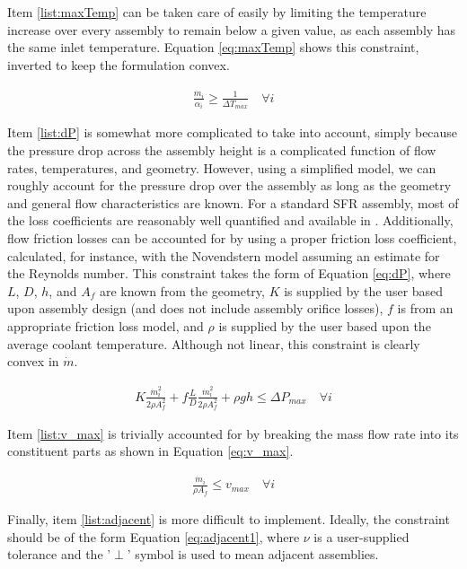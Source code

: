 \documentclass[11pt, oneside]{article}   	%
\begin{document}
Item \ref{list:maxTemp} can be taken care of easily by limiting the temperature increase over every assembly to remain below a given value, as each assembly has the same inlet temperature.
Equation \ref{eq:maxTemp} shows this constraint, inverted to keep the formulation convex.

\begin{align}
\frac{\dot{m}_i}{\alpha_i} \geq \frac{1}{\Delta T_{max}} \quad \forall i \label{eq:maxTemp}
\end{align}

Item \ref{list:dP} is somewhat more complicated to take into account, simply because the pressure drop across the assembly height is a complicated function of flow rates, temperatures, and geometry.
However, using a simplified model, we can roughly account for the pressure drop over the assembly as long as the geometry and general flow characteristics are known.
For a standard SFR assembly, most of the loss coefficients are reasonably well quantified and available in \cite{Waltar}.
Additionally, flow friction losses can be accounted for by using a proper friction loss coefficient, calculated, for instance, with the Novendstern model assuming an estimate for the Reynolds number.
This constraint takes the form of Equation \ref{eq:dP}, where $L$, $D$, $h$, and $A_f$ are known from the geometry, $K$ is supplied by the user based upon assembly design (and does not include assembly orifice losses), $f$ is from an appropriate friction loss model, and $\rho$ is supplied by the user based upon the average coolant temperature.
Although not linear, this constraint is clearly convex in $\dot{m}$.

\begin{align}
K \frac{\dot{m}_i^2}{2 \rho A_f^2} + f \frac{L}{D} \frac{\dot{m}_i^2}{2 \rho A_f^2} + \rho g h \leq \Delta P_{max}  \quad \forall i \label{eq:dP}
\end{align}

Item \ref{list:v_max} is trivially accounted for by breaking the mass flow rate into its constituent parts as shown in Equation \ref{eq:v_max}.

\begin{align}
\frac{\dot{m}_i}{\rho A_f} \leq v_{max} \quad \forall i \label{eq:v_max}
\end{align}

Finally, item \ref{list:adjacent} is more difficult to implement. 
Ideally, the constraint should be of the form Equation \ref{eq:adjacent1}, where $\nu$ is a user-supplied tolerance and the '$\perp$' symbol is used to mean adjacent assemblies.
\end{document}
